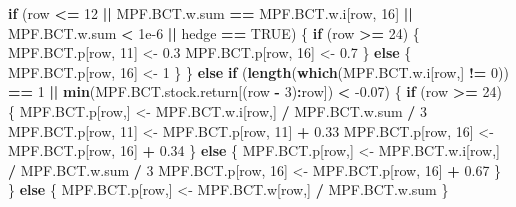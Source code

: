 \documentclass[]{article}
\newenvironment{Shaded}{\begin{snugshade}}{\end{snugshade}}
\newcommand{\ControlFlowTok}[1]{\textcolor[rgb]{0.13,0.29,0.53}{\textbf{#1}}}
\newcommand{\DecValTok}[1]{\textcolor[rgb]{0.00,0.00,0.81}{#1}}
\newcommand{\FloatTok}[1]{\textcolor[rgb]{0.00,0.00,0.81}{#1}}
\newcommand{\KeywordTok}[1]{\textcolor[rgb]{0.13,0.29,0.53}{\textbf{#1}}}
\newcommand{\NormalTok}[1]{#1}
\newcommand{\OperatorTok}[1]{\textcolor[rgb]{0.81,0.36,0.00}{\textbf{#1}}}
\newcommand{\OtherTok}[1]{\textcolor[rgb]{0.56,0.35,0.01}{#1}}
\newcommand{\StringTok}[1]{\textcolor[rgb]{0.31,0.60,0.02}{#1}}
\begin{document}
\begin{Shaded}
\begin{Highlighting}[]
    \ControlFlowTok{if}\NormalTok{ (row }\OperatorTok{<=}\StringTok{ }\DecValTok{12} \OperatorTok{||}\StringTok{ }\NormalTok{MPF.BCT.w.sum }\OperatorTok{==}\StringTok{ }\NormalTok{MPF.BCT.w.i[row, }\DecValTok{16}\NormalTok{] }\OperatorTok{||}
\StringTok{        }\NormalTok{MPF.BCT.w.sum }\OperatorTok{<}\StringTok{ }\FloatTok{1e-6} \OperatorTok{||}\StringTok{ }\NormalTok{hedge }\OperatorTok{==}\StringTok{ }\OtherTok{TRUE}\NormalTok{) \{}
      \ControlFlowTok{if}\NormalTok{ (row }\OperatorTok{>=}\StringTok{ }\DecValTok{24}\NormalTok{) \{}
\NormalTok{        MPF.BCT.p[row, }\DecValTok{11}\NormalTok{] <-}\StringTok{ }\FloatTok{0.3}
\NormalTok{        MPF.BCT.p[row, }\DecValTok{16}\NormalTok{] <-}\StringTok{ }\FloatTok{0.7}
\NormalTok{      \} }\ControlFlowTok{else}\NormalTok{ \{}
\NormalTok{        MPF.BCT.p[row, }\DecValTok{16}\NormalTok{] <-}\StringTok{ }\DecValTok{1}
\NormalTok{      \}}
\NormalTok{    \} }\ControlFlowTok{else} \ControlFlowTok{if}\NormalTok{ (}\KeywordTok{length}\NormalTok{(}\KeywordTok{which}\NormalTok{(MPF.BCT.w.i[row,] }\OperatorTok{!=}\StringTok{ }\DecValTok{0}\NormalTok{)) }\OperatorTok{==}\StringTok{ }\DecValTok{1} \OperatorTok{||}
\StringTok{               }\KeywordTok{min}\NormalTok{(MPF.BCT.stock.return[(row }\OperatorTok{-}\StringTok{ }\DecValTok{3}\NormalTok{)}\OperatorTok{:}\NormalTok{row]) }\OperatorTok{<}\StringTok{ }\FloatTok{-0.07}\NormalTok{) \{}
      \ControlFlowTok{if}\NormalTok{ (row }\OperatorTok{>=}\StringTok{ }\DecValTok{24}\NormalTok{) \{}
\NormalTok{        MPF.BCT.p[row,] <-}\StringTok{ }\NormalTok{MPF.BCT.w.i[row,] }\OperatorTok{/}\StringTok{ }\NormalTok{MPF.BCT.w.sum }\OperatorTok{/}\StringTok{ }\DecValTok{3}
\NormalTok{        MPF.BCT.p[row, }\DecValTok{11}\NormalTok{] <-}\StringTok{ }\NormalTok{MPF.BCT.p[row, }\DecValTok{11}\NormalTok{] }\OperatorTok{+}\StringTok{ }\FloatTok{0.33}
\NormalTok{        MPF.BCT.p[row, }\DecValTok{16}\NormalTok{] <-}\StringTok{ }\NormalTok{MPF.BCT.p[row, }\DecValTok{16}\NormalTok{] }\OperatorTok{+}\StringTok{ }\FloatTok{0.34}
\NormalTok{      \} }\ControlFlowTok{else}\NormalTok{ \{}
\NormalTok{        MPF.BCT.p[row,] <-}\StringTok{ }\NormalTok{MPF.BCT.w.i[row,] }\OperatorTok{/}\StringTok{ }\NormalTok{MPF.BCT.w.sum }\OperatorTok{/}\StringTok{ }\DecValTok{3}
\NormalTok{        MPF.BCT.p[row, }\DecValTok{16}\NormalTok{] <-}\StringTok{ }\NormalTok{MPF.BCT.p[row, }\DecValTok{16}\NormalTok{] }\OperatorTok{+}\StringTok{ }\FloatTok{0.67}
\NormalTok{      \}}
\NormalTok{    \} }\ControlFlowTok{else}\NormalTok{ \{}
\NormalTok{      MPF.BCT.p[row,] <-}\StringTok{ }\NormalTok{MPF.BCT.w[row,] }\OperatorTok{/}\StringTok{ }\NormalTok{MPF.BCT.w.sum}
\NormalTok{    \}}
    

\end{Highlighting}
\end{Shaded}
\end{document}
